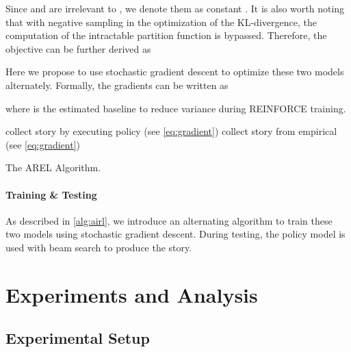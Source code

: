 \documentclass[11pt,a4paper]{article}
\begin{document}
Since  and  are irrelevant to , we denote them as constant . It is also worth noting that with negative sampling in the optimization of the KL-divergence, the computation of the intractable partition function  is bypassed. Therefore, the objective  can be further derived as


Here we propose to use stochastic gradient descent to optimize these two models alternately. Formally, the gradients can be written as

where  is the estimated baseline to reduce variance during REINFORCE training.

\begin{algorithm}[t]
\begin{algorithmic}[1]
\State collect story  by executing policy 
\State   (see \autoref{eq:gradient})
\State collect story  from empirical 
\State  (see \autoref{eq:gradient}) 
\EndIf
\EndFor
\end{algorithmic}
\caption{The AREL Algorithm.}\label{alg:airl}
\end{algorithm}


\paragraph{Training \& Testing} As described in \autoref{alg:airl}, we introduce an alternating algorithm to train these two models using stochastic gradient descent. During testing, the policy model is used with beam search to produce the story.

\section{Experiments and Analysis}

\label{sec:exp}
\subsection{Experimental Setup}
\end{document}
